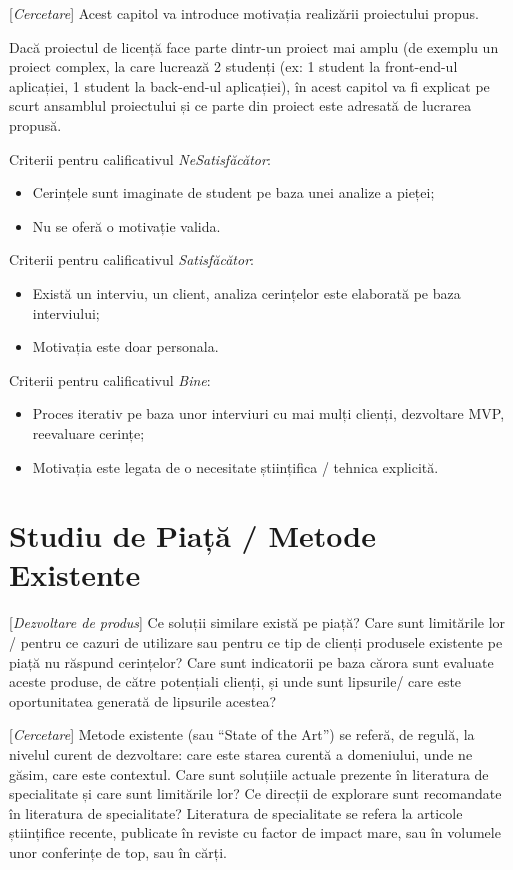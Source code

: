 \documentclass[12pt,a4paper]{report}
\newcommand{\worktype}[1]{[\textit{#1}] }
\newcommand{\dezvoltare}{\worktype{Dezvoltare de produs}}
\newcommand{\cercetare}{\worktype{Cercetare}}
\begin{document}
\cercetare Acest capitol va introduce motivația realizării proiectului propus.



Dacă proiectul de licență face parte dintr-un proiect mai amplu (de exemplu un proiect complex, la care lucrează 2 studenți (ex: 1 student la front-end-ul aplicației, 1 student la back-end-ul aplicației), în acest capitol va fi explicat pe scurt ansamblul proiectului și ce parte din proiect este adresată de lucrarea propusă. 

Criterii pentru calificativul \textit{Ne\textit{Satisfăcător}}: 
\begin{itemize}
	\item \dezvoltare Cerințele sunt imaginate de student pe baza unei analize a pieței;
	\item \cercetare Nu se oferă o motivație valida.
\end{itemize}

Criterii pentru calificativul \textit{Satisfăcător}: 
\begin{itemize}
	\item \dezvoltare Există un interviu, un client, analiza cerințelor este elaborată pe baza interviului;
	\item \cercetare Motivația este doar personala.
\end{itemize}


Criterii pentru calificativul \textit{Bine}: 
\begin{itemize}
	\item	 \dezvoltare Proces iterativ pe baza unor interviuri cu mai mulți clienți, dezvoltare MVP, reevaluare cerințe;
	\item	 \cercetare Motivația este legata de o necesitate științifica / tehnica explicită.
\end{itemize}


\chapter{Studiu de Piață / Metode Existente}
\dezvoltare Ce soluții similare există pe piață? Care sunt limitările lor / pentru ce cazuri de utilizare sau pentru ce tip de clienți produsele existente pe piață nu răspund cerințelor? Care sunt indicatorii pe baza cărora sunt evaluate aceste produse, de către potențiali clienți, și unde sunt lipsurile/ care este oportunitatea generată de lipsurile acestea?

\cercetare Metode existente (sau ``State of the Art'') se referă, de regulă, la nivelul curent de dezvoltare: care este starea curentă a domeniului, unde ne găsim, care este contextul. Care sunt soluțiile actuale prezente în literatura de specialitate și care sunt limitările lor? Ce direcții de explorare sunt recomandate în literatura de specialitate? Literatura de specialitate se refera la articole științifice recente, publicate în reviste cu factor de impact mare, sau în volumele unor conferințe de top, sau în cărți.
\end{document}
